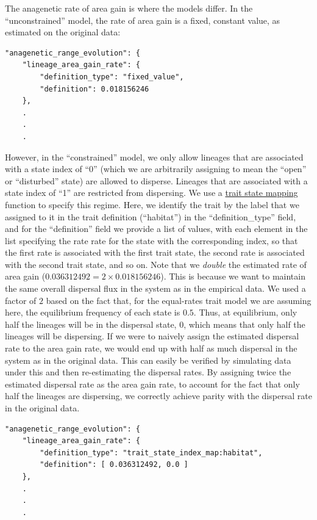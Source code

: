 \documentclass[11pt,openany]{memoir} %
\begin{document}
The anagenetic rate of area gain is where the models differ.
In the ``unconstrained'' model, the rate of area gain is a fixed, constant value, as estimated on the original data:
\begin{lstlisting}
"anagenetic_range_evolution": {
    "lineage_area_gain_rate": {
        "definition_type": "fixed_value",
        "definition": 0.018156246
    },
    .
    .
    .
\end{lstlisting}
However, in the ``constrained'' model, we only allow lineages that are associated with a state index of ``0'' (which we are arbitrarily assigning to mean the ``open'' or ``disturbed'' state) are allowed to disperse.
Lineages that are associated with a state index of ``1'' are restricted from dispersing.
We use a \hyperref[sec:trait-state-mapping]{trait state mapping} function to specify this regime.
Here, we identify the trait by the label that we assigned to it in the trait definition (``habitat'') in the ``definition\_type'' field, and for the ``definition'' field we provide a list of values, with each element in the list specifying the rate rate for the state with the corresponding index, so that the first rate is associated with the first trait state, the second rate is associated with the second trait state, and so on.
Note that we \textit{double} the estimated rate of area gain ($0.036312492 = 2 \times 0.018156246$).
This is because we want to maintain the same overall dispersal flux in the system as in the empirical data.
We used a factor of $2$ based on the fact that, for the equal-rates trait model we are assuming here, the equilibrium frequency of each state is $0.5$.
Thus, at equilibrium, only half the lineages will be in the dispersal state, $0$, which means that only half the lineages will be dispersing.
If we were to naively assign the estimated dispersal rate to the area gain rate, we would end up with half as much dispersal in the system as in the original data.
This can easily be verified by simulating data under this and then re-estimating the dispersal rates.
By assigning twice the estimated dispersal rate as the area gain rate, to account for the fact that only half the lineages are dispersing, we correctly achieve parity with the dispersal rate in the original data.
\begin{lstlisting}
"anagenetic_range_evolution": {
    "lineage_area_gain_rate": {
        "definition_type": "trait_state_index_map:habitat",
        "definition": [ 0.036312492, 0.0 ]
    },
    .
    .
    .
\end{lstlisting}
\end{document}
